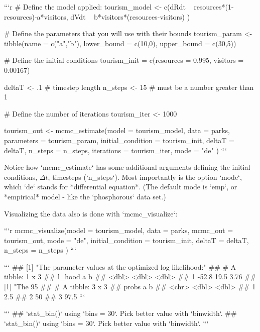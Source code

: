 \documentclass[
]{book}
\theoremstyle{definition}
\theoremstyle{definition}
\theoremstyle{definition}
\theoremstyle{remark}
\begin{document}
```r
# Define the model applied:
tourism_model <- c(dRdt ~ resources*(1-resources)-a*visitors,
                   dVdt ~  b*visitors*(resources-visitors)
                   )

# Define the parameters that you will use with their bounds
tourism_param <- tibble(name = c("a","b"),
                     lower_bound = c(10,0),
                     upper_bound = c(30,5))

# Define the initial conditions
tourism_init = c(resources = 0.995, visitors = 0.00167)

deltaT <- .1    # timestep length
n_steps <- 15   # must be a number greater than 1

# Define the number of iterations
tourism_iter <- 1000

tourism_out <- mcmc_estimate(model = tourism_model,
                             data = parks,
                             parameters = tourism_param,
                             initial_condition = tourism_init,
                             deltaT = deltaT,
                             n_steps = n_steps,
                             iterations = tourism_iter,
                             mode = "de"
                             )
```

Notice how `mcmc_estimate` has some additional arguments defining the initial conditions, $\Delta t$, timesteps (`n_steps`).  Most importantly is the option `mode`, which `de` stands for *differential equation*.  (The default mode is `emp`, or *empirical* model - like the `phosphorous` data set.)

Visualizing the data also is done with `mcmc_visualize`:


```r
mcmc_visualize(model = tourism_model, 
               data = parks, 
               mcmc_out = tourism_out,
               mode = "de",
               initial_condition = tourism_init,
               deltaT = deltaT,
               n_steps = n_steps
               )
```

```
## [1] "The parameter values at the optimized log likelihood:"
## # A tibble: 1 x 3
##   l_hood     a     b
##    <dbl> <dbl> <dbl>
## 1  -52.8  19.5  3.76
## [1] "The 95%
## # A tibble: 3 x 3
##   probs     a     b
##   <chr> <dbl> <dbl>
## 1 2.5%
## 2 50%
## 3 97.5%
```

```
## `stat_bin()` using `bins = 30`. Pick better value with `binwidth`.
## `stat_bin()` using `bins = 30`. Pick better value with `binwidth`.
```
\end{document}

